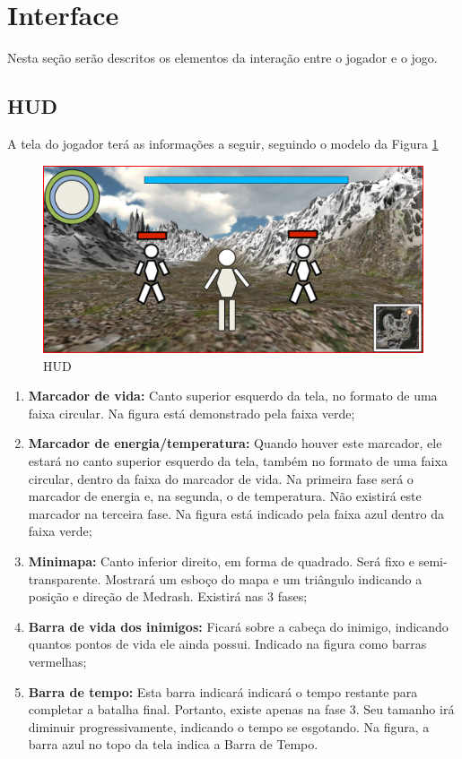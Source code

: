 \section{Interface}

Nesta seção serão descritos os elementos da interação entre o jogador e o
jogo.

\subsection{HUD}

A tela do jogador terá as informações a seguir, seguindo o modelo da
Figura \ref{fig:hud}
\begin{figure}[!ht]
 \centering
 \includegraphics[scale=0.59]{hud.png}
 \caption{HUD}
 \label{fig:hud}
\end{figure}
\begin{enumerate}
 \item {\bf Marcador de vida:} Canto superior esquerdo da tela, no 
formato de uma faixa circular. Na figura está demonstrado pela faixa
verde;
 \item {\bf Marcador de energia/temperatura:} Quando houver este marcador,
ele estará no canto superior esquerdo da tela, também no formato
de uma faixa circular, dentro da faixa do marcador de vida. Na primeira
fase será o marcador de energia e, na segunda, o de temperatura. Não
existirá este marcador na terceira fase. Na figura está indicado pela 
faixa azul dentro da faixa verde;
 \item {\bf Minimapa:} Canto inferior direito, em forma de quadrado.
Será fixo e semi-transparente. Mostrará um esboço do mapa e um triângulo
indicando a posição e direção de Medrash. Existirá nas 3 fases;
 \item {\bf Barra de vida dos inimigos:} Ficará sobre a cabeça do inimigo,
indicando quantos pontos de vida ele ainda possui. Indicado na figura
como barras vermelhas;
 \item {\bf Barra de tempo:} Esta barra indicará indicará o tempo restante
 para completar a batalha final. Portanto, existe apenas na fase 3.
Seu tamanho irá diminuir progressivamente, indicando o tempo se esgotando. Na 
figura, a barra azul no topo da tela indica a Barra de Tempo.
\end{enumerate}

